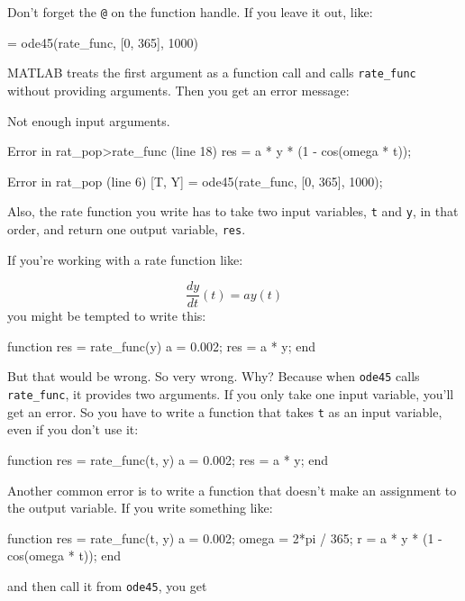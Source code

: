 Don't forget the \lstinline{@} on the function handle.
If you leave it out, like:

\begin{code}
[T, Y] = ode45(rate_func, [0, 365], 1000)
\end{code}
MATLAB treats the first argument as a function
call and calls \lstinline{rate_func} without providing arguments.
Then you get an error message:


\begin{code}
Not enough input arguments.

Error in rat_pop>rate_func (line 18)
    res = a * y * (1 - cos(omega * t));

Error in rat_pop (line 6)
    [T, Y] = ode45(rate_func, [0, 365], 1000);
\end{code}

Also, the rate function you write has to take two input variables,
\lstinline{t} and \lstinline{y}, in that order, and return one output variable,
\lstinline{res}.


If you're working with a rate function like:

\begin{equation*}
\frac{dy}{dt}(t) = a y(t)
\end{equation*}
you might be tempted to write this:

\begin{code}
function res = rate_func(y)        %
    a = 0.002;
    res = a * y;
end
\end{code}

But that would be wrong.  So very wrong.  Why?  Because
when \lstinline{ode45} calls \lstinline{rate_func}, it provides two arguments.
If you only take one input variable, you'll get an error.  So
you have to write a function that takes \lstinline{t} as an input
variable, even if you don't use it:


\begin{code}
function res = rate_func(t, y)     %
    a = 0.002;
    res = a * y;
end
\end{code}

Another common error is to write a function that doesn't make
an assignment to the output variable.  If you write something
like:

\begin{code}
function res = rate_func(t, y)
    a = 0.002;
    omega = 2*pi / 365;
    r = a * y * (1 - cos(omega * t));    %
end
\end{code}
 and then call it from \lstinline{ode45}, you get

